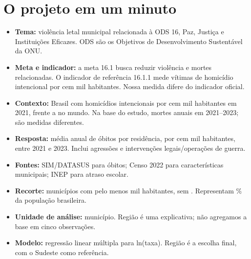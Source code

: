 \section{O projeto em um minuto}
\begin{itemize}
\item \textbf{Tema:} violência letal municipal relacionada à ODS 16, Paz, Justiça e Instituições Eficazes. ODS são os Objetivos de Desenvolvimento Sustentável da ONU.
\item \textbf{Meta e indicador:} a meta 16.1 busca reduzir violência e mortes relacionadas. O indicador de referência 16.1.1 mede vítimas de homicídio intencional por cem mil habitantes. Nossa medida difere do indicador oficial.
\item \textbf{Contexto:} Brasil com \nTaxaBrasilContexto{} homicídios intencionais por cem mil habitantes em 2021, frente a \nTaxaMundoContexto{} no mundo. Na base do estudo, \nHomAno{} mortes anuais em 2021--2023; são medidas diferentes.
\item \textbf{Resposta:} média anual de óbitos por residência, por cem mil habitantes, entre 2021 e 2023. Inclui agressões e intervenções legais/operações de guerra.
\item \textbf{Fontes:} SIM/DATASUS para óbitos; Censo 2022 para características municipais; INEP para atraso escolar.
\item \textbf{Recorte:} \nMunEsc{} municípios com pelo menos \nPopMin{} mil habitantes, sem \nForaNome. Representam \nPctPopEsc\% da população brasileira.
\item \textbf{Unidade de análise:} município. Região é uma explicativa; não agregamos a base em cinco observações.
\item \textbf{Modelo:} regressão linear múltipla para ln(taxa). Região é a escolha final, com o Sudeste como referência.
\end{itemize}

